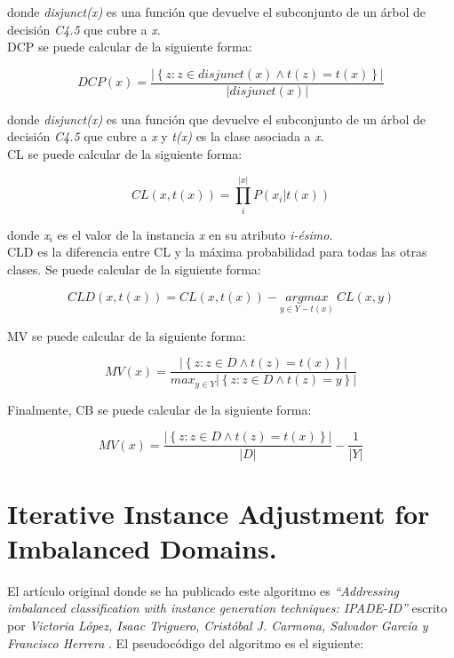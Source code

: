 donde \textit{disjunct(x)} es una función que devuelve el subconjunto de un árbol de decisión \textit{C4.5} que cubre a \textit{x}. \\

DCP se puede calcular de la siguiente forma:

\begin{equation}
	DCP(x) = \frac{\left | \left \{ z:z \in disjunct(x) \wedge t(z) = t(x) \right \} \right |}{\left | disjunct(x) \right |}
\end{equation}

donde \textit{disjunct(x)} es una función que devuelve el subconjunto de un árbol de decisión \textit{C4.5} que cubre a \textit{x} y \textit{t(x)} es la clase asociada a \textit{x}. \\

CL se puede calcular de la siguiente forma:

\begin{equation}
	CL(x, t(x)) = \prod_{i}^{\left | x \right |} P(x_i | t(x))
\end{equation}

donde \textit{x$_i$} es el valor de la instancia \textit{x} en su atributo \textit{i-ésimo}. \\

CLD es la diferencia entre CL y la máxima probabilidad para todas las otras clases. Se puede calcular de la siguiente forma:

\begin{equation}
	CLD(x, t(x)) = CL(x, t(x)) - \underset{y \in Y - t(x)}{argmax} \ CL(x, y)
\end{equation}

MV se puede calcular de la siguiente forma:

\begin{equation}
	MV(x) = \frac{\left | \left \{ z : z \in D \wedge t(z) = t(x) \right \} \right |}{max_{y\in Y} \left | \left \{ z : z \in D \wedge t(z) = y \right \} \right |}
\end{equation}

Finalmente, CB se puede calcular de la siguiente forma:

\begin{equation}
	MV(x) = \frac{\left | \left \{ z : z \in D \wedge t(z) = t(x) \right \} \right |}{\left | D \right |} - \frac{1}{\left | Y \right |}
\end{equation}

\section{Iterative Instance Adjustment for Imbalanced Domains.} \label{sec:alg_ipade_id}
El artículo original donde se ha publicado este algoritmo es \textit{``Addressing imbalanced classification with instance generation techniques: IPADE-ID''} escrito por \textit{Victoria López, Isaac Triguero, Cristóbal J. Carmona, Salvador García y Francisco Herrera} \cite{ipade}. El pseudocódigo del algoritmo es el siguiente:

